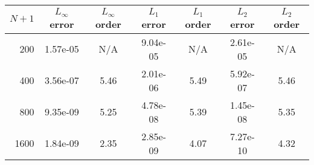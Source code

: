 \begin{tabular}{rcccccc}
    \toprule
    $N+1$ & $L_{\infty}$ error & $L_{\infty}$ order & $L_1$ error & $L_1$ order & $L_2$ error & $L_2$ order \\
    \midrule
      200 & 1.57e-05 &   N/A & 9.04e-05 &   N/A & 2.61e-05 &   N/A \\
      400 & 3.56e-07 &  5.46 & 2.01e-06 &  5.49 & 5.92e-07 &  5.46 \\
      800 & 9.35e-09 &  5.25 & 4.78e-08 &  5.39 & 1.45e-08 &  5.35 \\
     1600 & 1.84e-09 &  2.35 & 2.85e-09 &  4.07 & 7.27e-10 &  4.32 \\
    \bottomrule
\end{tabular}